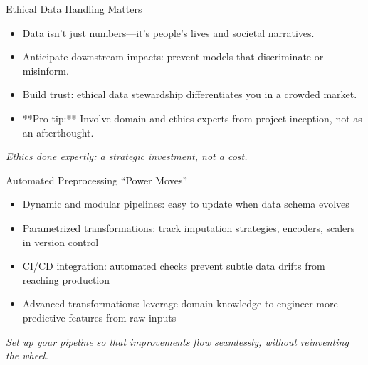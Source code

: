 \documentclass[aspectratio=169]{beamer}
\begin{document}
\begin{frame}{Ethical Data Handling Matters}
\begin{itemize}
\item Data isn’t just numbers—it’s people’s lives and societal narratives.
\item Anticipate downstream impacts: prevent models that discriminate or misinform.
\item Build trust: ethical data stewardship differentiates you in a crowded market.
\item **Pro tip:** Involve domain and ethics experts from project inception, not as an afterthought.
\end{itemize}

\emph{Ethics done expertly: a strategic investment, not a cost.}
\end{frame}

\begin{frame}{Automated Preprocessing “Power Moves”}
\begin{itemize}
\item Dynamic and modular pipelines: easy to update when data schema evolves
\item Parametrized transformations: track imputation strategies, encoders, scalers in version control
\item CI/CD integration: automated checks prevent subtle data drifts from reaching production
\item Advanced transformations: leverage domain knowledge to engineer more predictive features from raw inputs
\end{itemize}

\emph{Set up your pipeline so that improvements flow seamlessly, without reinventing the wheel.}
\end{frame}
\end{document}
